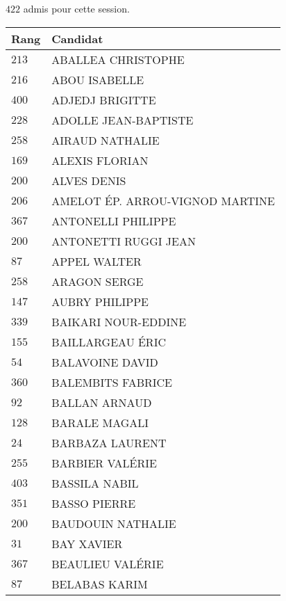 



  $422$ admis pour cette session.

  \begin{xltabular}{\linewidth}{|l|X|}
    \hline
    \textbf{Rang} & \textbf{Candidat} \\
    \hline
    $213$ & ABALLEA CHRISTOPHE \\
    \hline
    $216$ & ABOU ISABELLE \\
    \hline
    $400$ & ADJEDJ BRIGITTE \\
    \hline
    $228$ & ADOLLE JEAN-BAPTISTE \\
    \hline
    $258$ & AIRAUD NATHALIE \\
    \hline
    $169$ & ALEXIS FLORIAN \\
    \hline
    $200$ & ALVES DENIS \\
    \hline
    $206$ & AMELOT ÉP. ARROU-VIGNOD MARTINE \\
    \hline
    $367$ & ANTONELLI PHILIPPE \\
    \hline
    $200$ & ANTONETTI RUGGI JEAN \\
    \hline
    $87$ & APPEL WALTER \\
    \hline
    $258$ & ARAGON SERGE \\
    \hline
    $147$ & AUBRY PHILIPPE \\
    \hline
    $339$ & BAIKARI NOUR-EDDINE \\
    \hline
    $155$ & BAILLARGEAU ÉRIC \\
    \hline
    $54$ & BALAVOINE DAVID \\
    \hline
    $360$ & BALEMBITS FABRICE \\
    \hline
    $92$ & BALLAN ARNAUD \\
    \hline
    $128$ & BARALE MAGALI \\
    \hline
    $24$ & BARBAZA LAURENT \\
    \hline
    $255$ & BARBIER VALÉRIE \\
    \hline
    $403$ & BASSILA NABIL \\
    \hline
    $351$ & BASSO PIERRE \\
    \hline
    $200$ & BAUDOUIN NATHALIE \\
    \hline
    $31$ & BAY XAVIER \\
    \hline
    $367$ & BEAULIEU VALÉRIE \\
    \hline
    $87$ & BELABAS KARIM \\
    \hline

\end{xltabular}
